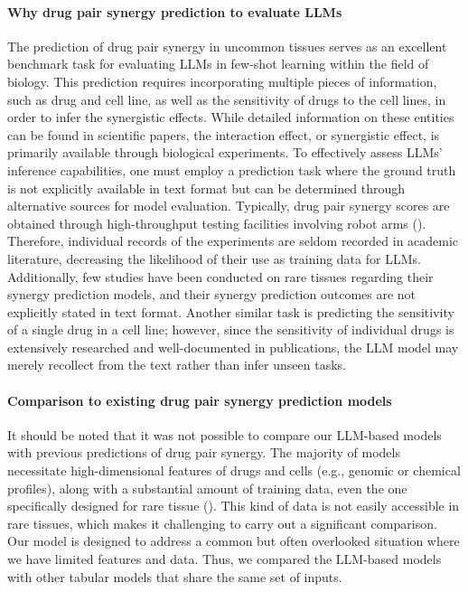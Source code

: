 \paragraph{Why drug pair synergy prediction to evaluate LLMs}
The prediction of drug pair synergy in uncommon tissues serves as an excellent benchmark task for evaluating LLMs in few-shot learning within the field of biology. This prediction requires incorporating multiple pieces of information, such as drug and cell line, as well as the sensitivity of drugs to the cell lines, in order to infer the synergistic effects. While detailed information on these entities can be found in scientific papers, the interaction effect, or synergistic effect, is primarily available through biological experiments. To effectively assess LLMs' inference capabilities, one must employ a prediction task where the ground truth is not explicitly available in text format but can be determined through alternative sources for model evaluation. Typically, drug pair synergy scores are obtained through high-throughput testing facilities involving robot arms (\cite{he_methods_2018}). Therefore, individual records of the experiments are seldom recorded in academic literature, decreasing the likelihood of their use as training data for LLMs. Additionally, few studies have been conducted on rare tissues regarding their synergy prediction models, and their synergy prediction outcomes are not explicitly stated in text format. Another similar task is predicting the sensitivity of a single drug in a cell line; however, since the sensitivity of individual drugs is extensively researched and well-documented in publications, the LLM model may merely recollect from the text rather than infer unseen tasks.

\paragraph{Comparison to existing drug pair synergy prediction models}
It should be noted that it was not possible to compare our LLM-based models with previous predictions of drug pair synergy. The majority of models necessitate high-dimensional features of drugs and cells (e.g., genomic or chemical profiles), along with a substantial amount of training data, even the one specifically designed for rare tissue (\cite{kim_anticancer_2021}). This kind of data is not easily accessible in rare tissues, which makes it challenging to carry out a significant comparison. Our model is designed to address a common but often overlooked situation where we have limited features and data. Thus, we compared the LLM-based models with other tabular models that share the same set of inputs.

